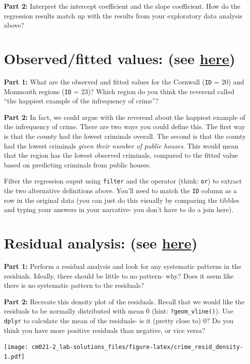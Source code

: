 \documentclass[]{article}
\begin{document}
\textbf{Part 2:} Interpret the intercept coefficient and the slope
coefficient. How do the regression results match up with the results
from your exploratory data analysis above?

\hypertarget{observedfitted-values-see-here}{%
\section{\texorpdfstring{Observed/fitted values: (see
\href{http://moderndive.com/5-regression.html\#model1points}{here})}{Observed/fitted values: (see here)}}\label{observedfitted-values-see-here}}

\textbf{Part 1:} What are the observed and fitted values for the
Cornwall (\texttt{ID} = 20) and Monmouth regions (\texttt{ID} = 23)?
Which region do you think the reverend called ``the happiest example of
the infrequency of crime''?

\textbf{Part 2:} In fact, we could argue with the reverend about the
happiest example of the infrequency of crime. There are two ways you
could define this. The first way is that the county had the lowest
criminals overall. The second is that the county had the lowest
criminals \emph{given their number of public houses}. This would mean
that the region has the lowest observed criminals, compared to the
fitted value based on predicting criminals from public houses.

Filter the regression ouput using \texttt{filter} and the
\texttt{\textbar{}} operator (think: \texttt{or}) to extract the two
alternative definitions above. You'll need to match the \texttt{ID}
column as a row in the original data (you can just do this visually by
comparing the tibbles and typing your answers in your narrative- you
don't have to do a join here).

\hypertarget{residual-analysis-see-here}{%
\section{\texorpdfstring{Residual analysis: (see
\href{http://moderndive.com/5-regression.html\#model1points}{here})}{Residual analysis: (see here)}}\label{residual-analysis-see-here}}

\textbf{Part 1:} Perform a residual analysis and look for any systematic
patterns in the residuals. Ideally, there should be little to no
pattern- why? Does it seem like there is no systematic pattern to the
residuals?

\textbf{Part 2:} Recreate this density plot of the residuals. Recall
that we would like the residuals to be normally distributed with mean 0
(hint: \texttt{?geom\_vline()}). Use \texttt{dplyr} to calculate the
mean of the residuals- is it (pretty close to) 0? Do you think you have
more positive residuals than negative, or vice versa?

\texttt{[image: cm021-2\_lab-solutions\_files/figure-latex/crime\_resid\_density-1.pdf]}
\end{document}
